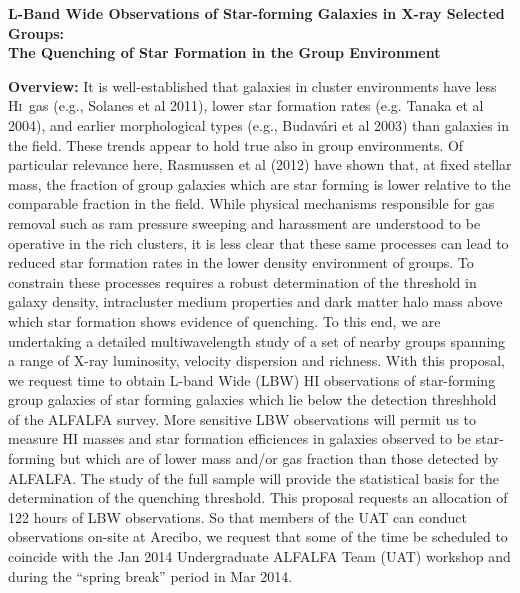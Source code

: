 \documentclass[11pt]{article}
\newcommand{\HI}{H\textsc{i}}
\begin{document}
\parindent 0pt
\baselineskip 12pt
\parskip 8pt
\null
\begin{center}
\vskip -1.2cm
\bf L-Band Wide Observations of Star-forming Galaxies in X-ray Selected Groups: \\
The Quenching of Star Formation in the Group Environment \rm
\end{center}


{\bf Overview:} \hskip 5pt
It is well-established that galaxies in cluster environments have less \HI\ gas (e.g., Solanes {et al} 2011),
lower star formation rates (e.g. Tanaka {et al} 2004), and earlier morphological
types (e.g., Budav\'{a}ri  {et al} 2003) than galaxies in the field.
These trends appear to hold true also in group environments. Of particular relevance here,
Rasmussen {et al} (2012) have shown that, at fixed
stellar mass, the fraction of group galaxies which are star forming is
lower relative to the comparable fraction in the field.
While physical mechanisms responsible for gas removal
such as ram pressure sweeping and harassment
are understood to be operative in the rich clusters, it is less clear that
these same processes can lead to reduced star formation rates in the lower density environment
of groups.
To constrain these processes requires a robust determination of the threshold in galaxy density,
intracluster medium properties and dark matter halo mass
above which star formation shows evidence of quenching. To this end,
we are undertaking a detailed multiwavelength study of
a set of nearby groups spanning a range of X-ray luminosity, velocity dispersion and richness.
With this proposal, we request time to obtain L-band Wide (LBW) HI observations of star-forming group galaxies
of star forming galaxies which lie below the detection threshhold of the ALFALFA survey. More sensitive
LBW observations will permit us to measure HI masses and star formation efficiences in galaxies
observed to be star-forming but which are
of lower mass and/or gas fraction than those detected by ALFALFA. The study of the full sample
will provide the statistical basis for the determination of the quenching threshold. This proposal requests an
allocation of 122 hours of LBW observations. So that members of the UAT can conduct observations
on-site at Arecibo, we request that some of the time be scheduled to coincide with
the Jan 2014 Undergraduate ALFALFA Team (UAT) workshop and during the ``spring break'' period
in Mar 2014.
\end{document}
